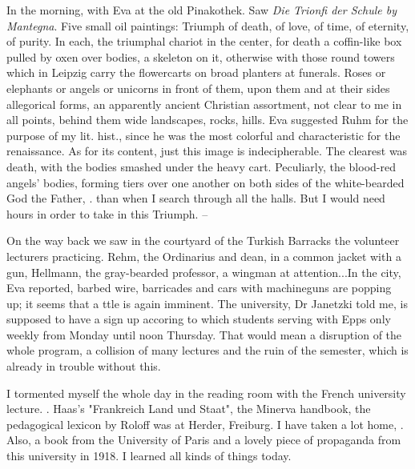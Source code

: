 
In the morning, with Eva at the old Pinakothek. Saw \textit{Die Trionfi der Schule by Mantegna}. Five small oil paintings: Triumph of death, of love, of time, of eternity, of purity. In each, the triumphal chariot in the center, for death a coffin-like box pulled by oxen over bodies, a skeleton on it, otherwise with those round towers which in Leipzig carry the flowercarts on broad planters at funerals. Roses or elephants or angels or unicorns in front of them, upon them and at their sides allegorical forms, an apparently ancient Christian assortment, not clear to me in all points, behind them wide landscapes, rocks, hills. Eva suggested Ruhm for the purpose of my lit. hist., since he was the most colorful and characteristic for the renaissance. As for its content, just this image is indecipherable. The clearest was death, with the bodies smashed under the heavy cart. Peculiarly, the blood-red angels' bodies, forming tiers over one another on both sides of the white-bearded God the Father, .  than when I search through all the halls. But I would need hours in order to take in this Triumph. --

On the way back we saw in the courtyard of the Turkish Barracks the volunteer lecturers practicing. Rehm, the Ordinarius and dean, in a common jacket with a gun, Hellmann, the gray-bearded professor, a wingman at attention...In the city, Eva reported, barbed wire, barricades and cars with machineguns are popping up; it seems that a 
ttle is again imminent. The university, Dr Janetzki told me, is supposed to have a sign up accoring to which students serving with Epps only  weekly from Monday until noon Thursday. That would mean a disruption of the whole program, a collision of many lectures and the ruin of the semester, which is already in trouble without this.

I tormented myself the whole day in the reading room with the French university lecture. . Haas's "Frankreich Land und Staat", the Minerva handbook, the pedagogical lexicon by Roloff was at Herder, Freiburg. I have taken a lot home, . Also, a book from the University of Paris and a lovely piece of propaganda from this university in 1918. I learned all kinds of things today.

\missing
